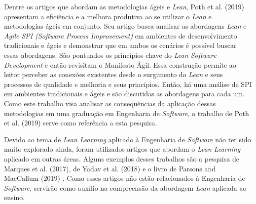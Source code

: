 Dentre os artigos que abordam as metodologias ágeis e \textit{Lean},\nocite{poth2019lean} Poth et al. (2019) apresentam a eficiência e a melhora produtiva ao se utilizar o \textit{Lean} e metodologias ágeis em conjunto. Seu artigo busca analisar as abordagens \textit{Lean} e \textit{Agile SPI (Software Process Improvement)} em ambientes de desenvolvimento tradicionais e ágeis e demonstrar que em ambos os cenários é possível buscar essas abordagens. São pontuados os princípios chave do \textit{Lean Software Development} e então revisitam o Manifesto Ágil. Essa construção permite ao leitor perceber as conexões existentes desde o surgimento do \textit{Lean} e seus processos de qualidade e melhoria e seus princípios. Então, há uma análise de SPI em ambientes tradicionais e ágeis e são discutidas as abordagens para cada um. Como este trabalho visa analisar as consequências da aplicação dessas metodologias em uma graduação em Engenharia de \textit{Software}, o trabalho de Poth et al. (2019) serve como referência a esta pesquisa.

Devido ao tema de \textit{Lean Learning} aplicado à Engenharia de \textit{Software} não ter sido muito explorado ainda, foram utilizados artigos que abordam o \textit{Lean Learning} aplicado em outras áreas. Alguns exemplos desses trabalhos são a pesquisa de Marques et al. (2017)\nocite{marques2017enhancing}, de Yadav et al. (2018)\nocite{Yadav2018} e o livro de Parsons and MacCallum (2019) \nocite{parsons2019agile}. Como esses artigos não estão relacionados à Engenharia de \textit{Software}, servirão como auxílio na compreensão da abordagem \textit{Lean} aplicada ao ensino.
